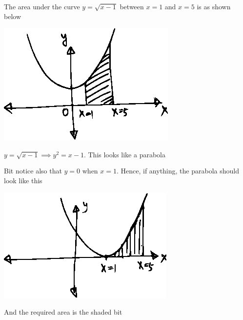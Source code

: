 \documentclass[14pt,fleqn]{extarticle}
\begin{document}
 
\begin{snippet}
    
    \incorrect
    
    The area under the curve $y = \sqrt{x-1}$ between $x=1$ and $x=5$ is as shown below 
    
    \begin{center}
\includegraphics[scale=1.4]{wrong.eps}
\end{center}
    
    \reason
    
    $y = \sqrt{x-1} \implies y^2 = x - 1$. This looks like a parabola \newline 
    
    Bit notice also that $ y =0$ when $x = 1$. Hence, if anything, the parabola 
    should look like this 
    
    \begin{center}
\includegraphics[scale=1.4]{right.eps}
\end{center}

    And the required area is the shaded bit 
    
\end{snippet} 
\end{document}
